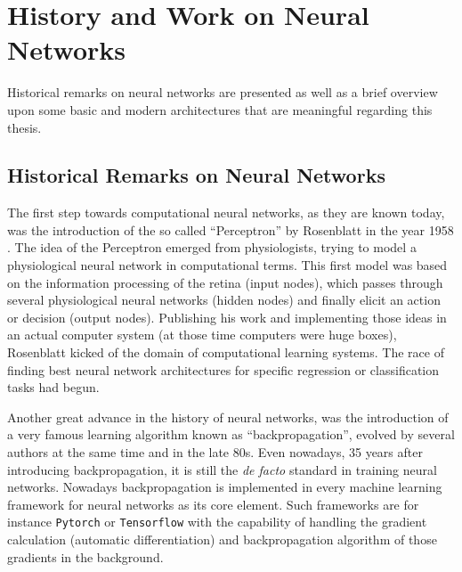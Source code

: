 
\section{History and Work on Neural Networks}\label{sec:prev_nn}
Historical remarks on neural networks are presented as well as a brief overview upon some basic and modern architectures that are meaningful regarding this thesis.



\subsection{Historical Remarks on Neural Networks}\label{sec:prev_nn_history}
The first step towards computational neural networks, as they are known today, was the introduction of the so called \enquote{Perceptron} by Rosenblatt in the year 1958 \cite{Rosenblatt1958}. 
The idea of the Perceptron emerged from physiologists, trying to model a physiological neural network in computational terms. 
This first model was based on the information processing of the retina (input nodes), which passes through several physiological neural networks (hidden nodes) and finally elicit an action or decision (output nodes).
Publishing his work and implementing those ideas in an actual computer system (at those time computers were huge boxes), Rosenblatt kicked of the domain of computational learning systems.
The race of finding best neural network architectures for specific regression or classification tasks had begun.

Another great advance in the history of neural networks, was the introduction of a very famous learning algorithm known as \enquote{backpropagation}, evolved by several authors at the same time \cite{LeCun1986} and \cite{Rumelhart1986} in the late 80s. 
Even nowadays, 35 years after introducing backpropagation, it is still the \emph{de facto} standard in training neural networks.
Nowadays backpropagation is implemented in every machine learning framework for neural networks as its core element.
Such frameworks are for instance \texttt{Pytorch} \cite{Pytorch} or \texttt{Tensorflow} \cite{Tensorflow} with the capability of handling the gradient calculation (automatic differentiation) and backpropagation algorithm of those gradients in the background.

